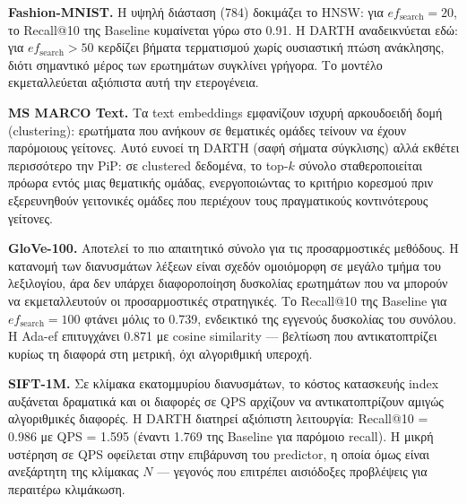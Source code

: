 \documentclass[12pt,a4paper]{article}
\begin{document}
\textbf{Fashion-MNIST.} Η υψηλή διάσταση (784) δοκιμάζει το HNSW: για $ef_{\text{search}} = 20$, το Recall@10 της Baseline κυμαίνεται γύρω στο 0.91. Η DARTH αναδεικνύεται εδώ: για $ef_{\text{search}} > 50$ κερδίζει βήματα τερματισμού χωρίς ουσιαστική πτώση ανάκλησης, διότι σημαντικό μέρος των ερωτημάτων συγκλίνει γρήγορα. Το μοντέλο εκμεταλλεύεται αξιόπιστα αυτή την ετερογένεια.

\textbf{MS MARCO Text.} Τα text embeddings εμφανίζουν ισχυρή αρκουδοειδή δομή (clustering): ερωτήματα που ανήκουν σε θεματικές ομάδες τείνουν να έχουν παρόμοιους γείτονες. Αυτό ευνοεί τη DARTH (σαφή σήματα σύγκλισης) αλλά εκθέτει περισσότερο την PiP: σε clustered δεδομένα, το top-$k$ σύνολο σταθεροποιείται πρόωρα εντός μιας θεματικής ομάδας, ενεργοποιώντας το κριτήριο κορεσμού πριν εξερευνηθούν γειτονικές ομάδες που περιέχουν τους πραγματικούς κοντινότερους γείτονες.

\textbf{GloVe-100.} Αποτελεί το πιο απαιτητικό σύνολο για τις προσαρμοστικές μεθόδους. Η κατανομή των διανυσμάτων λέξεων είναι σχεδόν ομοιόμορφη σε μεγάλο τμήμα του λεξιλογίου, άρα δεν υπάρχει διαφοροποίηση δυσκολίας ερωτημάτων που να μπορούν να εκμεταλλευτούν οι προσαρμοστικές στρατηγικές. Το Recall@10 της Baseline για $ef_{\text{search}}=100$ φτάνει μόλις το 0.739, ενδεικτικό της εγγενούς δυσκολίας του συνόλου. Η Ada-ef επιτυγχάνει 0.871 με cosine similarity --- βελτίωση που αντικατοπτρίζει κυρίως τη διαφορά στη μετρική, όχι αλγοριθμική υπεροχή.

\textbf{SIFT-1M.} Σε κλίμακα εκατομμυρίου διανυσμάτων, το κόστος κατασκευής index αυξάνεται δραματικά και οι διαφορές σε QPS αρχίζουν να αντικατοπτρίζουν αμιγώς αλγοριθμικές διαφορές. Η DARTH διατηρεί αξιόπιστη λειτουργία: Recall@10 = 0.986 με QPS = 1.595 (έναντι 1.769 της Baseline για παρόμοιο recall). Η μικρή υστέρηση σε QPS οφείλεται στην επιβάρυνση του predictor, η οποία όμως είναι ανεξάρτητη της κλίμακας $N$ --- γεγονός που επιτρέπει αισιόδοξες προβλέψεις για περαιτέρω κλιμάκωση.
\end{document}
